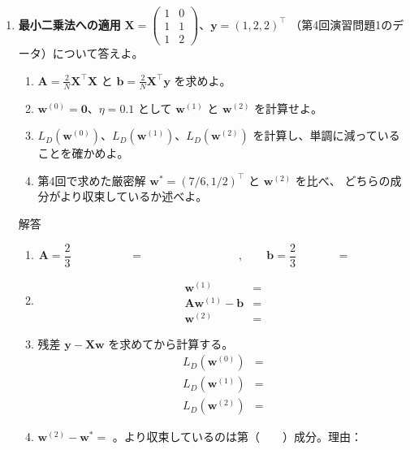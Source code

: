 \documentclass[a4paper,dvipdfmx]{jsarticle}
\newcommand{\提出期限}{2026年10月26日（月）}
\newcommand{\学籍番号}{0000000}
\newcommand{\氏名}{氏名を書く}
\newcommand{\提出日}{2026年10月26日}
\newenvironment{answer}{\begin{itembox}[l]{解答}}{\end{itembox}}
\begin{document}
\begin{enumerate}
  \item \textbf{最小二乗法への適用}\quad
    $\bm{X} = \begin{pmatrix} 1 & 0 \\ 1 & 1 \\ 1 & 2 \end{pmatrix}$、$\bm{y} = (1, 2, 2)^\top$
    （第4回演習問題1のデータ）について答えよ。
    \begin{enumerate}
      \item $\bm{A} = \frac{2}{N}\bm{X}^\top\bm{X}$ と $\bm{b} = \frac{2}{N}\bm{X}^\top\bm{y}$ を求めよ。
      \item $\bm{w}^{(0)} = \bm{0}$、$\eta = 0.1$ として $\bm{w}^{(1)}$ と $\bm{w}^{(2)}$ を計算せよ。
      \item $L_D(\bm{w}^{(0)})$、$L_D(\bm{w}^{(1)})$、$L_D(\bm{w}^{(2)})$ を計算し、単調に減っていることを確かめよ。
      \item 第4回で求めた厳密解 $\bm{w}^* = (7/6, 1/2)^\top$ と $\bm{w}^{(2)}$ を比べ、
        どちらの成分がより収束しているか述べよ。
    \end{enumerate}
    \begin{answer}
      \begin{enumerate}
        \item
          \begin{equation*}
            \bm{A} = \frac{2}{3}\,\phantom{XXXXXX} = \phantom{XXXXXXXXXX}, \qquad
            \bm{b} = \frac{2}{3}\,\phantom{XXXX} = \phantom{XXXXXX}
          \end{equation*}
        \item
          \begin{align*}
            \bm{w}^{(1)} &= \\
            \bm{A}\bm{w}^{(1)} - \bm{b} &= \\
            \bm{w}^{(2)} &=
          \end{align*}
        \item 残差 $\bm{y} - \bm{X}\bm{w}$ を求めてから計算する。
          \begin{align*}
            L_D(\bm{w}^{(0)}) &= \\
            L_D(\bm{w}^{(1)}) &= \\
            L_D(\bm{w}^{(2)}) &=
          \end{align*}
        \item $\bm{w}^{(2)} - \bm{w}^* = $ \phantom{XXXXXXXX}。より収束しているのは第（　　）成分。理由：
          \vspace{10mm}
      \end{enumerate}
    \end{answer}


\end{enumerate}
\end{document}
